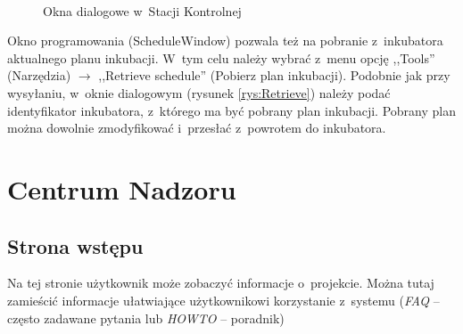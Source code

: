 \begin{figure}[b]
	\centering
	\mbox{
		\quad
	}
	\caption{Okna dialogowe w~Stacji Kontrolnej}
	\label{rys:dialogi}
\end{figure}

Okno programowania (ScheduleWindow) pozwala też na pobranie z~inkubatora
aktualnego planu inkubacji. W~tym celu należy wybrać z~menu opcję ,,Tools''
(Narzędzia) $\rightarrow$ ,,Retrieve schedule'' (Pobierz plan inkubacji).
Podobnie jak przy wysyłaniu, w~oknie dialogowym (rysunek \ref{rys:Retrieve})
należy podać identyfikator inkubatora, z~którego ma być pobrany plan inkubacji.
Pobrany plan można dowolnie zmodyfikować i~przesłać z~powrotem do inkubatora.

\section{Centrum Nadzoru}

\subsection{Strona wstępu}
Na tej stronie użytkownik może zobaczyć informacje o~projekcie. Można tutaj
zamieścić informacje ułatwiające użytkownikowi korzystanie z~systemu
(\emph{FAQ} -- często zadawane pytania lub \emph{HOWTO} -- poradnik)


